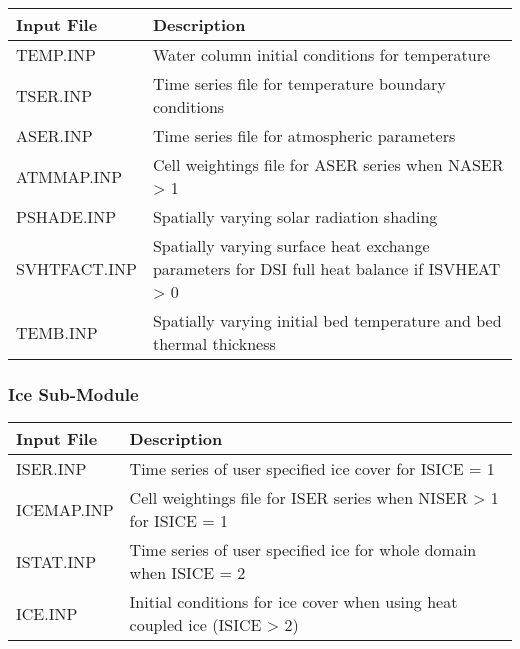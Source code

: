 \documentclass[letterpaper,10pt,english]{sphinxmanual}
\begin{document}
\begin{savenotes}\sphinxattablestart
\centering
\begin{tabulary}{\linewidth}[t]{|T|T|}
\hline
\sphinxstyletheadfamily 
Input File
&\sphinxstyletheadfamily 
Description
\\
\hline
TEMP.INP
&
Water column initial conditions for temperature
\\
\hline
TSER.INP
&
Time series file for temperature boundary conditions
\\
\hline
ASER.INP
&
Time series file for atmospheric parameters
\\
\hline
ATMMAP.INP
&
Cell weightings file for ASER series when NASER \textgreater{} 1
\\
\hline
PSHADE.INP
&
Spatially varying solar radiation shading
\\
\hline
SVHTFACT.INP
&
Spatially varying surface heat exchange parameters for DSI full heat balance if ISVHEAT \textgreater{} 0
\\
\hline
TEMB.INP
&
Spatially varying initial bed temperature and bed thermal thickness
\\
\hline
\end{tabulary}
\par
\sphinxattableend\end{savenotes}


\subsubsection{Ice Sub-Module}
\label{\detokenize{inputfiles/temperature:ice-sub-module}}

\begin{savenotes}\sphinxattablestart
\centering
\begin{tabulary}{\linewidth}[t]{|T|T|}
\hline
\sphinxstyletheadfamily 
Input File
&\sphinxstyletheadfamily 
Description
\\
\hline
ISER.INP
&
Time series of user specified ice cover for ISICE = 1
\\
\hline
ICEMAP.INP
&
Cell weightings file for ISER series when NISER \textgreater{} 1 for ISICE = 1
\\
\hline
ISTAT.INP
&
Time series of user specified ice for whole domain when ISICE = 2
\\
\hline
ICE.INP
&
Initial conditions for ice cover when using heat coupled ice (ISICE \textgreater{} 2)
\\
\hline
\end{tabulary}
\par
\sphinxattableend\end{savenotes}
\end{document}
